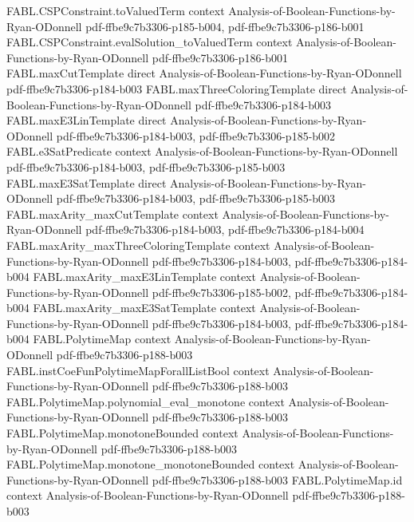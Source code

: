 \begin{theorem}
\proofstep
  {FABL.CSPConstraint.toValuedTerm}
  {context}
  {Analysis-of-Boolean-Functions-by-Ryan-ODonnell}
  {pdf-ffbe9c7b3306-p185-b004,
    pdf-ffbe9c7b3306-p186-b001}
\proofstep
  {FABL.CSPConstraint.evalSolution_toValuedTerm}
  {context}
  {Analysis-of-Boolean-Functions-by-Ryan-ODonnell}
  {pdf-ffbe9c7b3306-p186-b001}
\proofstep
  {FABL.maxCutTemplate}
  {direct}
  {Analysis-of-Boolean-Functions-by-Ryan-ODonnell}
  {pdf-ffbe9c7b3306-p184-b003}
\proofstep
  {FABL.maxThreeColoringTemplate}
  {direct}
  {Analysis-of-Boolean-Functions-by-Ryan-ODonnell}
  {pdf-ffbe9c7b3306-p184-b003}
\proofstep
  {FABL.maxE3LinTemplate}
  {direct}
  {Analysis-of-Boolean-Functions-by-Ryan-ODonnell}
  {pdf-ffbe9c7b3306-p184-b003,
    pdf-ffbe9c7b3306-p185-b002}
\proofstep
  {FABL.e3SatPredicate}
  {context}
  {Analysis-of-Boolean-Functions-by-Ryan-ODonnell}
  {pdf-ffbe9c7b3306-p184-b003,
    pdf-ffbe9c7b3306-p185-b003}
\proofstep
  {FABL.maxE3SatTemplate}
  {direct}
  {Analysis-of-Boolean-Functions-by-Ryan-ODonnell}
  {pdf-ffbe9c7b3306-p184-b003,
    pdf-ffbe9c7b3306-p185-b003}
\proofstep
  {FABL.maxArity_maxCutTemplate}
  {context}
  {Analysis-of-Boolean-Functions-by-Ryan-ODonnell}
  {pdf-ffbe9c7b3306-p184-b003,
    pdf-ffbe9c7b3306-p184-b004}
\proofstep
  {FABL.maxArity_maxThreeColoringTemplate}
  {context}
  {Analysis-of-Boolean-Functions-by-Ryan-ODonnell}
  {pdf-ffbe9c7b3306-p184-b003,
    pdf-ffbe9c7b3306-p184-b004}
\proofstep
  {FABL.maxArity_maxE3LinTemplate}
  {context}
  {Analysis-of-Boolean-Functions-by-Ryan-ODonnell}
  {pdf-ffbe9c7b3306-p185-b002,
    pdf-ffbe9c7b3306-p184-b004}
\proofstep
  {FABL.maxArity_maxE3SatTemplate}
  {context}
  {Analysis-of-Boolean-Functions-by-Ryan-ODonnell}
  {pdf-ffbe9c7b3306-p184-b003,
    pdf-ffbe9c7b3306-p184-b004}
\proofstep
  {FABL.PolytimeMap}
  {context}
  {Analysis-of-Boolean-Functions-by-Ryan-ODonnell}
  {pdf-ffbe9c7b3306-p188-b003}
\proofstep
  {FABL.instCoeFunPolytimeMapForallListBool}
  {context}
  {Analysis-of-Boolean-Functions-by-Ryan-ODonnell}
  {pdf-ffbe9c7b3306-p188-b003}
\proofstep
  {FABL.PolytimeMap.polynomial_eval_monotone}
  {context}
  {Analysis-of-Boolean-Functions-by-Ryan-ODonnell}
  {pdf-ffbe9c7b3306-p188-b003}
\proofstep
  {FABL.PolytimeMap.monotoneBounded}
  {context}
  {Analysis-of-Boolean-Functions-by-Ryan-ODonnell}
  {pdf-ffbe9c7b3306-p188-b003}
\proofstep
  {FABL.PolytimeMap.monotone_monotoneBounded}
  {context}
  {Analysis-of-Boolean-Functions-by-Ryan-ODonnell}
  {pdf-ffbe9c7b3306-p188-b003}
\proofstep
  {FABL.PolytimeMap.id}
  {context}
  {Analysis-of-Boolean-Functions-by-Ryan-ODonnell}
  {pdf-ffbe9c7b3306-p188-b003}

\end{theorem}
